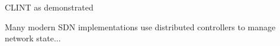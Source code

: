 CLINT as demonstrated 

Many modern SDN implementations use distributed controllers to manage network state...
